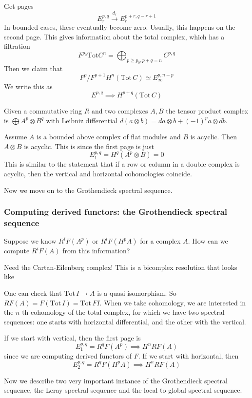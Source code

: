 Get pages $$E_{r}^{p,q}\xrightarrow{d_{r}} E_{r}^{p+r,q-r+1}$$
In bounded cases, these eventually become zero. Usually, this happens on the second page. This gives information about the total complex, which has a filtration $$F^{p_{0}} \mathrm{Tot}C^n=\bigoplus_{p\geq p_{0}, p+q=n} C^{p,q}$$Then we claim that $$F^p/F^{p+1} H^n(\mathrm{Tot}\,C)\simeq E_{\infty}^{p,n-p}$$We write this as $$E^{p,q}\implies H^{p+q}(\mathrm{Tot}\,C)$$

Given a commutative ring $R$ and two complexes $A,B$ the tensor product complex is $\bigoplus A^p\otimes B^q$ with Leibniz differential $d(a\otimes b)=da\otimes b + (-1)^p a\otimes db$. 

Assume $A$ is a bounded above complex of flat modules and $B$ is acyclic. Then $A\otimes B$ is acyclic. This is since the first page is just $$E_{1}^{p,q}=H^q(A^p\otimes B)=0$$
This is similar to the statement that if a row or column in a double complex is acyclic, then the vertical and horizontal cohomologies coincide.

Now we move on to the Grothendieck spectral sequence.

\subsubsection{Computing derived functors: the Grothendieck spectral sequence}

Suppose we know $R^iF(A^p)$ or $R^iF(H^pA)$ for a complex $A$. How can we compute $R^iF(A)$ from this information?

Need the Cartan-Eilenberg complex! This is a bicomplex resolution that looks like %

One can check that $\mathrm{Tot}\,I \rightarrow A$ is a quasi-isomorphism. So $RF(A)=F(\mathrm{Tot}\,I)=\mathrm{Tot}\,FI$. When we take cohomology, we are interested in the $n$-th cohomology of the total complex, for which we have two spectral sequences: one starts with horizontal differential, and the other with the vertical. 

If we start with vertical, then the first page is $$E_{1}^{p,q}=R^qF(A^p)\implies H^nRF(A)$$since we are computing derived functors of $F$. If we start with horizontal, then $$E_{2}^{p,q}=R^qF(H^pA)\implies H^nRF(A)$$

Now we describe two very important instance of the Grothendieck spectral sequence, the Leray spectral sequence and the local to global spectral sequence.

